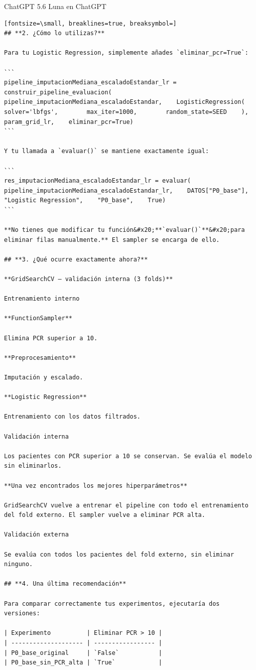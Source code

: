 \documentclass[12pt,a4paper,oneside]{book}
\begin{document}
\begin{iaresp}{ChatGPT 5.6 Luna en ChatGPT}
\begin{Verbatim}[fontsize=\small, breaklines=true, breaksymbol=]
## **2. ¿Cómo lo utilizas?**

Para tu Logistic Regression, simplemente añades `eliminar_pcr=True`:

```
pipeline_imputacionMediana_escaladoEstandar_lr = construir_pipeline_evaluacion(    pipeline_imputacionMediana_escaladoEstandar,    LogisticRegression(        solver='lbfgs',        max_iter=1000,        random_state=SEED    ),    param_grid_lr,    eliminar_pcr=True)
```

Y tu llamada a `evaluar()` se mantiene exactamente igual:

```
res_imputacionMediana_escaladoEstandar_lr = evaluar(    pipeline_imputacionMediana_escaladoEstandar_lr,    DATOS["P0_base"],    "Logistic Regression",    "P0_base",    True)
```

**No tienes que modificar tu función&#x20;**`evaluar()`**&#x20;para eliminar filas manualmente.** El sampler se encarga de ello.

## **3. ¿Qué ocurre exactamente ahora?**

**GridSearchCV — validación interna (3 folds)**

Entrenamiento interno

**FunctionSampler**

Elimina PCR superior a 10.

**Preprocesamiento**

Imputación y escalado.

**Logistic Regression**

Entrenamiento con los datos filtrados.

Validación interna

Los pacientes con PCR superior a 10 se conservan. Se evalúa el modelo sin eliminarlos.

**Una vez encontrados los mejores hiperparámetros**

GridSearchCV vuelve a entrenar el pipeline con todo el entrenamiento del fold externo. El sampler vuelve a eliminar PCR alta.

Validación externa

Se evalúa con todos los pacientes del fold externo, sin eliminar ninguno.

## **4. Una última recomendación**

Para comparar correctamente tus experimentos, ejecutaría dos versiones:

| Experimento          | Eliminar PCR > 10 |
| -------------------- | ----------------- |
| P0_base_original     | `False`           |
| P0_base_sin_PCR_alta | `True`            |


\end{Verbatim}
\end{iaresp}
\end{document}
